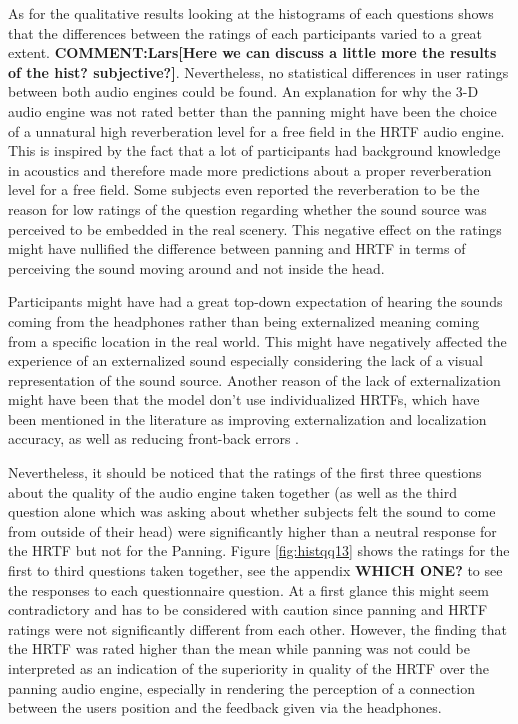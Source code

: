 \documentclass[journal]{IEEEtran}
\begin{document}
As for the qualitative results looking at the histograms of each questions shows that the differences between the ratings of each participants varied to a great extent. \textbf{COMMENT:Lars[Here we can discuss a little more the results of the hist? subjective?]}. Nevertheless, no statistical differences in user ratings between both audio engines could be found. An explanation for why the 3-D audio engine was not rated better than the panning might have been the choice of a unnatural high reverberation level for a free field in the HRTF audio engine. This is inspired by the fact that a lot of participants had background knowledge in acoustics and therefore made more predictions about a proper reverberation level for a free field. Some subjects even reported the reverberation to be the reason for low ratings of the question regarding whether the sound source was perceived to be embedded in the real scenery. This negative effect on the ratings might have nullified the difference between panning and HRTF in terms of perceiving the sound moving around and not inside the head.

Participants might have had a great top-down expectation of hearing the sounds coming from the headphones rather than being externalized meaning coming from a specific location in the real world. This might have negatively affected the experience of an externalized sound especially considering the lack of a visual representation of the sound source. Another reason of the lack of externalization might have been that the model don't use individualized HRTFs, which have been mentioned in the literature as improving externalization and localization accuracy, as well as reducing front-back errors \cite{begault2000direct, frederic1997}. 

Nevertheless, it should be noticed that the ratings of the first three questions about the quality of the audio engine taken together (as well as the third question alone which was asking about whether subjects felt the sound to come from outside of their head) were significantly higher than a neutral response for the HRTF but not for the Panning. Figure \ref{fig:histqq13} shows the ratings for the first to third questions taken together, see the appendix \textbf{WHICH ONE?} to see the responses to each questionnaire question. At a first glance this might seem contradictory and has to be considered with caution since panning and HRTF ratings were not significantly different from each other. However, the finding that the HRTF was rated higher than the mean while panning was not could be interpreted as an indication of the superiority in quality of the HRTF over the panning audio engine, especially in rendering the perception of a connection between the users position and the feedback given via the headphones. 
\end{document}
